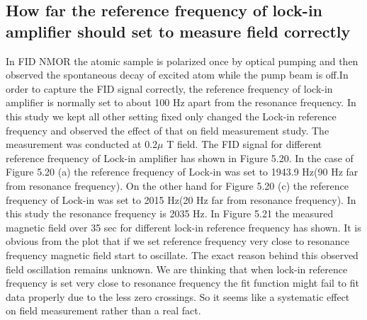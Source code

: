 \documentclass[12pt]{report}
\begin{document}
   \subsection{How far the reference frequency of lock-in amplifier should set to measure field correctly}
  
  In FID NMOR the atomic sample is polarized once by optical pumping and then observed the spontaneous decay of excited atom while the pump beam is off.In order to capture the FID signal correctly, the reference frequency of lock-in amplifier is normally set to about 100 Hz apart from the resonance frequency. In this study we kept all other setting fixed only changed the Lock-in reference frequency and observed the effect of that on field measurement study. The measurement was conducted at $0.2\mu$ T field. The FID signal for different reference frequency of Lock-in amplifier has shown in Figure 5.20. In the case of Figure 5.20 (a) the reference frequency of Lock-in was set to 1943.9 Hz(90 Hz far from resonance frequency). On the other hand for Figure 5.20 (c) the reference frequency of Lock-in was set to 2015 Hz(20 Hz far from resonance frequency). In this study the resonance frequency is 2035 Hz. In Figure 5.21 the measured magnetic field over 35 sec for different lock-in reference frequency has shown. It is obvious from the plot that if we set reference frequency very close to resonance frequency magnetic field start to oscillate. The exact reason behind this observed field oscillation remains unknown. We are thinking that when lock-in reference frequency is set very close to resonance frequency the fit function might fail to fit data properly due to the less zero crossings. So it seems like a systematic effect on field measurement rather than a real fact.
\end{document}
